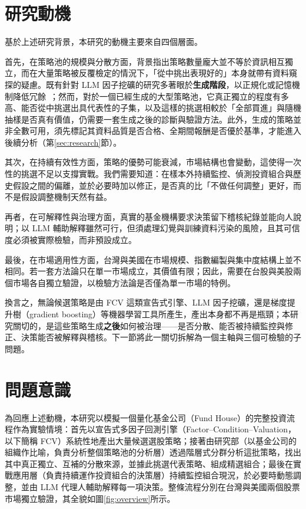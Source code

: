 \section{研究動機}\label{sec:motivation}

基於上述研究背景，本研究的動機主要來自四個層面。

首先，在策略池的規模與分散方面，背景指出策略數量龐大並不等於資訊相互獨立，而在大量策略被反覆檢定的情況下，「從中挑出表現好的」本身就帶有資料窺探的疑慮。既有針對 LLM 因子挖礦的研究多著眼於\textbf{生成階段}，以正規化或記憶機制降低冗餘~\parencite{tang2025alphaagent, wang2026factorminer}；然而，對於一個已經生成的大型策略池，它真正獨立的程度有多高、能否從中挑選出具代表性的子集，以及這樣的挑選相較於「全部買進」與隨機抽樣是否真有價值，仍需要一套生成之後的診斷與驗證方法。此外，生成的策略並非全數可用，須先標記其資料品質是否合格、全期間報酬是否優於基準，才能進入後續分析（第\ref{sec:research}節）。

其次，在持續有效性方面，策略的優勢可能衰減，市場結構也會變動，這使得一次性的挑選不足以支撐實戰。我們需要知道：在樣本外持續監控、偵測投資組合與歷史假設之間的偏離，並於必要時加以修正，是否真的比「不做任何調整」更好，而不是假設調整機制天然有益。

再者，在可解釋性與治理方面，真實的基金機構要求決策留下稽核紀錄並能向人說明；以 LLM 輔助解釋雖然可行，但須處理幻覺與訓練資料污染的風險，且其可信度必須被實際檢驗，而非預設成立。

最後，在市場適用性方面，台灣與美國在市場規模、指數編製與集中度結構上並不相同。若一套方法論只在單一市場成立，其價值有限；因此，需要在台股與美股兩個市場各自獨立驗證，以檢驗方法論是否僅為單一市場的特例。

換言之，無論候選策略是由 FCV 這類宣告式引擎、LLM 因子挖礦，還是梯度提升樹（gradient boosting）等機器學習工具所產生，產出本身都不再是瓶頸；本研究關切的，是這些策略生成\textbf{之後}如何被治理——是否分散、能否被持續監控與修正、決策能否被解釋與稽核。下一節將此一關切拆解為一個主軸與三個可檢驗的子問題。

\section{問題意識}\label{sec:questions}

為回應上述動機，本研究以模擬一個量化基金公司（Fund House）的完整投資流程作為實驗情境：首先以宣告式多因子回測引擎（Factor–Condition–Valuation，以下簡稱 FCV）系統性地產出大量候選選股策略；接著由研究部（以基金公司的組織作比喻，負責分析整個策略池的分析層）透過階層式分群分析這批策略，找出其中真正獨立、互補的分散來源，並據此挑選代表策略、組成精選組合；最後在實戰應用層（負責持續運作投資組合的決策層）持續監控組合現況，於必要時動態調整，並由 LLM 代理人輔助解釋每一項決策。整條流程分別在台灣與美國兩個股票市場獨立驗證，其全貌如圖\ref{fig:overview}所示。

